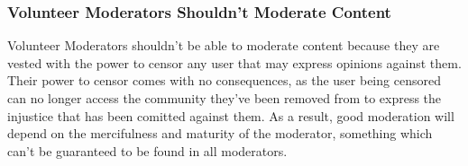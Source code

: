 \documentclass[a4paper]{article}
\begin{document}
\subsubsection{Volunteer Moderators Shouldn't Moderate Content}
Volunteer Moderators shouldn't be able to moderate content because they are vested with the power to censor any user
that may express opinions against them. Their power to censor comes with no consequences, as the user being censored
can no longer access the community they've been removed from to express the injustice that has been comitted against 
them. As a result, good moderation will depend on the mercifulness and maturity of the moderator, something which
can't be guaranteed to be found in all moderators.

\newpage

\nocite{*} 
\printbibliography
\end{document}
